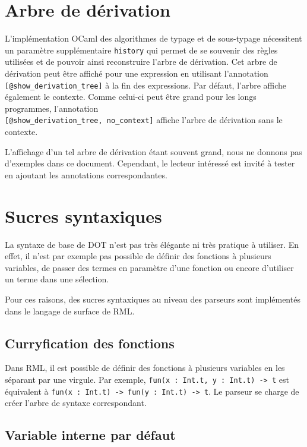 \section{Arbre de dérivation}

L'implémentation OCaml des algorithmes de typage et de sous-typage nécessitent
un paramètre supplémentaire \verb|history| qui permet de se souvenir des règles
utilisées et de pouvoir ainsi reconstruire l'arbre de dérivation. Cet arbre de
dérivation peut être affiché pour une expression en utilisant l'annotation
\verb|[@show_derivation_tree]| à la fin des expressions. Par défaut, l'arbre
affiche également le contexte. Comme celui-ci peut être grand pour les
longs programmes, l'annotation \\ \verb|[@show_derivation_tree, no_context]|
affiche l'arbre de dérivation sans le contexte.

L'affichage d'un tel arbre de dérivation étant souvent grand, nous ne donnons pas
d'exemples dans ce document. Cependant, le lecteur intéressé est invité à tester
en ajoutant les annotations correspondantes. 

\section{Sucres syntaxiques}

La syntaxe de base de DOT n'est pas très élégante ni très pratique à utiliser.
En effet, il n'est par exemple pas possible de définir des fonctions à plusieurs
variables, de passer des termes en paramètre d'une fonction ou encore d'utiliser
un terme dans une sélection.

Pour ces raisons, des sucres syntaxiques au niveau des parseurs sont implémentés
dans le langage de surface de RML.

\subsection*{Curryfication des fonctions}

Dans RML, il est possible de définir des fonctions à plusieurs variables en les
séparant par une virgule.
Par exemple, \verb|fun(x : Int.t, y : Int.t) -> t| est équivalent à
\verb|fun(x : Int.t) -> fun(y : Int.t) -> t|. Le parseur se charge de créer l'arbre de
syntaxe correspondant.

\subsection*{Variable interne par défaut}

